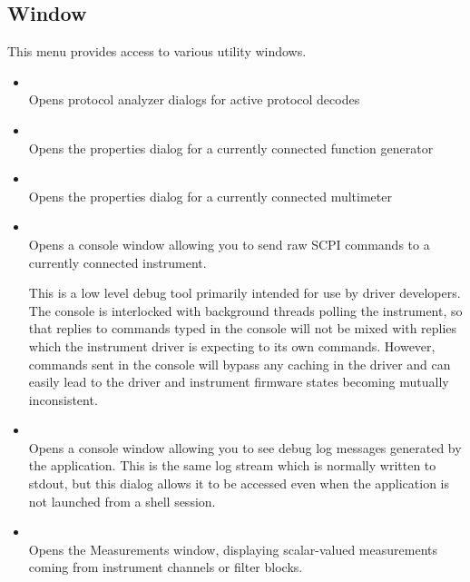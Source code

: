 \subsection{Window}

This menu provides access to various utility windows.

\begin{itemize}

\item {}\\
Opens protocol analyzer dialogs for active protocol decodes

\item {}\\
Opens the properties dialog for a currently connected function generator

\item {}\\
Opens the properties dialog for a currently connected multimeter

\item {}\\
Opens a console window allowing you to send raw SCPI commands to a currently connected instrument.

This is a low level debug tool primarily intended for use by driver developers. The console is interlocked with
background threads polling the instrument, so that replies to commands typed in the console will not be mixed with
replies which the instrument driver is expecting to its own commands. However, commands sent in the console will bypass
any caching in the driver and can easily lead to the driver and instrument firmware states becoming mutually
inconsistent.

\item {}\\
Opens a console window allowing you to see debug log messages generated by the application. This is the same log stream
which is normally written to stdout, but this dialog allows it to be accessed even when the application is not launched
from a shell session.

\item {}\\
Opens the Measurements window, displaying scalar-valued measurements coming from instrument channels or filter blocks.


\end{itemize}
